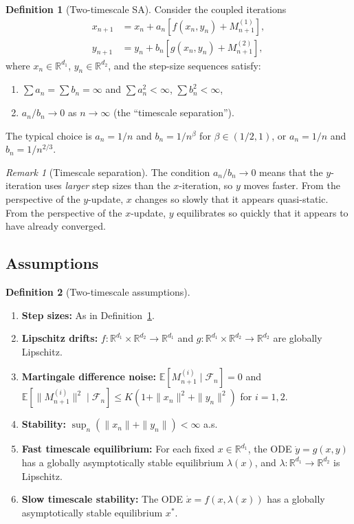 \documentclass[11pt,a4paper]{article}
\theoremstyle{definition}
\newtheorem{definition}{Definition}[section]
\theoremstyle{plain}
\theoremstyle{remark}
\newtheorem{remark}{Remark}[section]
\newcommand{\R}{\mathbb{R}}
\newcommand{\E}{\mathbb{E}}
\begin{document}
\begin{definition}[Two-timescale SA]
\label{def:two-timescale}
Consider the coupled iterations
\begin{align}
  x_{n+1} &= x_n + a_n [f(x_n, y_n) + M_{n+1}^{(1)}], \label{eq:slow} \\
  y_{n+1} &= y_n + b_n [g(x_n, y_n) + M_{n+1}^{(2)}], \label{eq:fast}
\end{align}
where $x_n \in \R^{d_1}$, $y_n \in \R^{d_2}$, and the step-size sequences satisfy:
\begin{enumerate}[label=(\roman*)]
\item $\sum a_n = \sum b_n = \infty$ and $\sum a_n^2 < \infty$, $\sum b_n^2 < \infty$,
\item $a_n / b_n \to 0$ as $n \to \infty$ \quad (the ``timescale separation'').
\end{enumerate}
The typical choice is $a_n = 1/n$ and $b_n = 1/n^\beta$ for $\beta \in (1/2, 1)$,
or $a_n = 1/n$ and $b_n = 1/n^{2/3}$.
\end{definition}

\begin{remark}[Timescale separation]
\label{rem:timescale}
The condition $a_n / b_n \to 0$ means that the $y$-iteration uses \emph{larger} step
sizes than the $x$-iteration, so $y$ moves faster. From the perspective of the
$y$-update, $x$ changes so slowly that it appears quasi-static. From the perspective
of the $x$-update, $y$ equilibrates so quickly that it appears to have already
converged.
\end{remark}

\subsection{Assumptions}

\begin{definition}[Two-timescale assumptions]
\label{def:two-ts-assumptions}
\begin{enumerate}[label=(E\arabic*)]
\item \label{E1} \textbf{Step sizes:} As in Definition~\ref{def:two-timescale}.
\item \label{E2} \textbf{Lipschitz drifts:} $f : \R^{d_1} \times \R^{d_2} \to \R^{d_1}$
  and $g : \R^{d_1} \times \R^{d_2} \to \R^{d_2}$ are globally Lipschitz.
\item \label{E3} \textbf{Martingale difference noise:}
  $\E[M_{n+1}^{(i)} \mid \mathcal{F}_n] = 0$ and
  $\E[\|M_{n+1}^{(i)}\|^2 \mid \mathcal{F}_n] \leq K(1 + \|x_n\|^2 + \|y_n\|^2)$
  for $i = 1, 2$.
\item \label{E4} \textbf{Stability:} $\sup_n (\|x_n\| + \|y_n\|) < \infty$ a.s.
\item \label{E5} \textbf{Fast timescale equilibrium:} For each fixed $x \in \R^{d_1}$,
  the ODE $\dot{y} = g(x, y)$ has a globally asymptotically stable equilibrium
  $\lambda(x)$, and $\lambda : \R^{d_1} \to \R^{d_2}$ is Lipschitz.
\item \label{E6} \textbf{Slow timescale stability:} The ODE
  $\dot{x} = f(x, \lambda(x))$ has a globally asymptotically stable equilibrium $x^*$.
\end{enumerate}
\end{definition}
\end{document}
